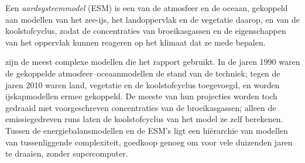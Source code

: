 \begin{omfigure}
\par{}\label{fig:b3:climate-models:grid}
\end{omfigure}

\begin{definition}[Aardsysteemmodel]\label{def:b3:climate-models:esm}
Een \emph{aardsysteemmodel} (ESM) is een  van de atmosfeer en de oceaan, gekoppeld aan modellen van
het zee-ijs, het landoppervlak en de vegetatie daarop, en van de koolstofcyclus,
zodat de concentraties van broeikasgassen en de eigenschappen van het
oppervlak kunnen reageren op het klimaat dat ze mede bepalen.
\end{definition}

 zijn de meest complexe modellen die het rapport gebruikt. In
de jaren 1990 waren de gekoppelde atmosfeer--oceaanmodellen de stand van de techniek;
tegen de jaren 2010 waren land, vegetatie en de koolstofcyclus toegevoegd, en worden
ijskapmodellen ermee gekoppeld. De meeste van hun projecties
worden toch gedraaid met voorgeschreven concentraties van de broeikasgassen;
alleen de emissiegedreven runs laten de koolstofcyclus van het model ze zelf berekenen.
Tussen de energiebalansmodellen en de ESM's ligt een hiërarchie van modellen van
tussenliggende complexiteit, goedkoop genoeg om voor vele duizenden
jaren te draaien, zonder supercomputer.

